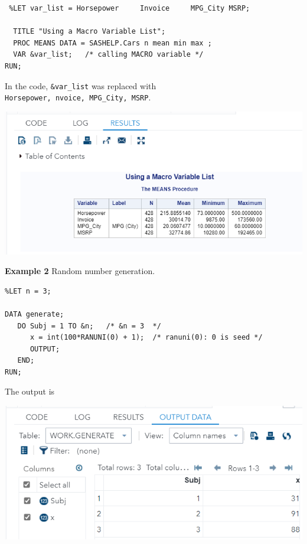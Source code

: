 \documentclass[
]{book}
\begin{document}
\begin{verbatim}
 %LET var_list = Horsepower     Invoice     MPG_City MSRP;

  TITLE "Using a Macro Variable List";
  PROC MEANS DATA = SASHELP.Cars n mean min max ;
  VAR &var_list;   /* calling MACRO variable */
RUN;
\end{verbatim}

In the code, \texttt{\&var\_list} was replaced with \texttt{Horsepower,\ nvoice,\ MPG\_City,\ MSRP}.

\begin{center}\includegraphics[width=1\linewidth]{img14/w14-macro-example01} \end{center}

\textbf{Example 2} Random number generation.

\begin{verbatim}
%LET n = 3;

DATA generate;
   DO Subj = 1 TO &n;   /* &n = 3  */
      x = int(100*RANUNI(0) + 1);  /* ranuni(0): 0 is seed */
      OUTPUT;
   END;
RUN;
\end{verbatim}

The output is

\begin{center}\includegraphics[width=1\linewidth]{img14/w14-RandomNumGeneration} \end{center}
\end{document}
